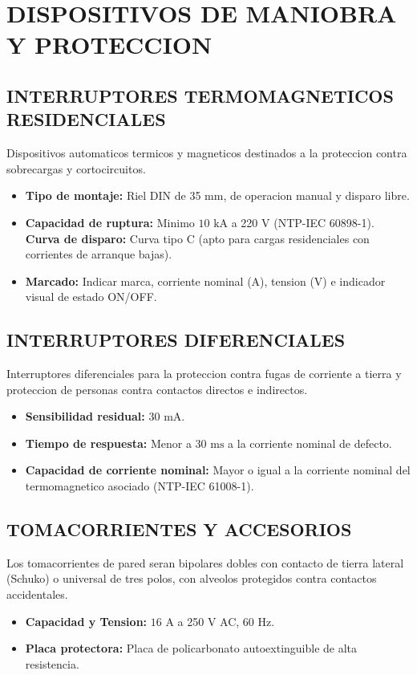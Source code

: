 \section{DISPOSITIVOS DE MANIOBRA Y PROTECCION}

\subsection{INTERRUPTORES TERMOMAGNETICOS RESIDENCIALES}
Dispositivos automaticos termicos y magneticos destinados a la proteccion contra sobrecargas y cortocircuitos.
\begin{itemize}
  \item \textbf{Tipo de montaje:} Riel DIN de 35 mm, de operacion manual y disparo libre.
  \item \textbf{Capacidad de ruptura:} Minimo \(10\text{ kA}\) a 220 V (NTP-IEC 60898-1).
  \textbf{Curva de disparo:} Curva tipo C (apto para cargas residenciales con corrientes de arranque bajas).
  \item \textbf{Marcado:} Indicar marca, corriente nominal (A), tension (V) e indicador visual de estado ON/OFF.
\end{itemize}

\subsection{INTERRUPTORES DIFERENCIALES}
Interruptores diferenciales para la proteccion contra fugas de corriente a tierra y proteccion de personas contra contactos directos e indirectos.
\begin{itemize}
  \item \textbf{Sensibilidad residual:} \(30\text{ mA}\).
  \item \textbf{Tiempo de respuesta:} Menor a \(30\text{ ms}\) a la corriente nominal de defecto.
  \item \textbf{Capacidad de corriente nominal:} Mayor o igual a la corriente nominal del termomagnetico asociado (NTP-IEC 61008-1).
\end{itemize}

\subsection{TOMACORRIENTES Y ACCESORIOS}
Los tomacorrientes de pared seran bipolares dobles con contacto de tierra lateral (Schuko) o universal de tres polos, con alveolos protegidos contra contactos accidentales.
\begin{itemize}
  \item \textbf{Capacidad y Tension:} \(16\text{ A}\) a 250 V AC, 60 Hz.
  \item \textbf{Placa protectora:} Placa de policarbonato autoextinguible de alta resistencia.
\end{itemize}

